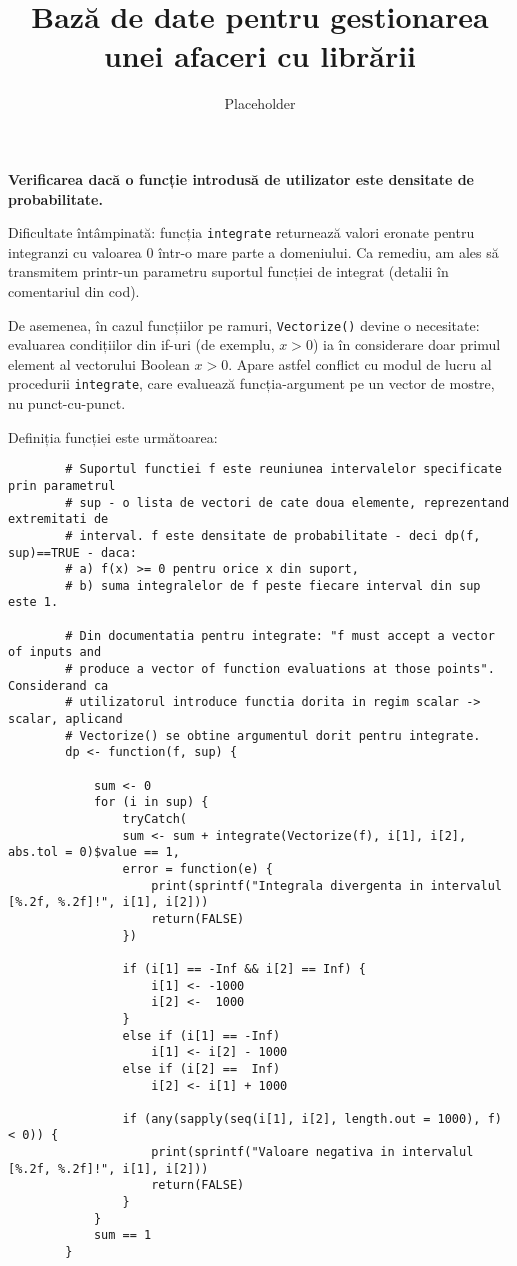 \documentclass[12pt]{article}
\title{Bază de date pentru gestionarea unei afaceri cu librării}
\author{Placeholder}
\begin{document}
	\textbf{Verificarea dacă o funcție introdusă de utilizator este densitate de probabilitate.}\vspace{5mm}
	
	Dificultate întâmpinată: funcția \lstinline|integrate| returnează valori eronate pentru integranzi cu valoarea $0$ într-o mare parte a domeniului. Ca remediu, am ales să transmitem printr-un parametru suportul funcției de integrat (detalii în comentariul din cod).\par
	De asemenea, în cazul funcțiilor pe ramuri, \lstinline|Vectorize()| devine o necesitate: evaluarea condițiilor din if-uri (de exemplu, $x > 0$) ia în considerare doar primul element al vectorului Boolean $x > 0$. Apare astfel conflict cu modul de lucru al procedurii \lstinline|integrate|, care evaluează funcția-argument pe un vector de mostre, nu punct-cu-punct.\par
	Definiția funcției este următoarea: \\
	
	\begin{lstlisting}
		# Suportul functiei f este reuniunea intervalelor specificate prin parametrul
		# sup - o lista de vectori de cate doua elemente, reprezentand extremitati de
		# interval. f este densitate de probabilitate - deci dp(f, sup)==TRUE - daca:
		# a) f(x) >= 0 pentru orice x din suport,
		# b) suma integralelor de f peste fiecare interval din sup este 1.
		
		# Din documentatia pentru integrate: "f must accept a vector of inputs and
		# produce a vector of function evaluations at those points". Considerand ca
		# utilizatorul introduce functia dorita in regim scalar -> scalar, aplicand
		# Vectorize() se obtine argumentul dorit pentru integrate.
		dp <- function(f, sup) {
			
			sum <- 0
			for (i in sup) {
				tryCatch(
				sum <- sum + integrate(Vectorize(f), i[1], i[2], abs.tol = 0)$value == 1,
				error = function(e) {
					print(sprintf("Integrala divergenta in intervalul [%.2f, %.2f]!", i[1], i[2]))
					return(FALSE)
				})
				
				if (i[1] == -Inf && i[2] == Inf) {
					i[1] <- -1000
					i[2] <-  1000
				}
				else if (i[1] == -Inf)
					i[1] <- i[2] - 1000
				else if (i[2] ==  Inf)
					i[2] <- i[1] + 1000
				
				if (any(sapply(seq(i[1], i[2], length.out = 1000), f) < 0)) {
					print(sprintf("Valoare negativa in intervalul [%.2f, %.2f]!", i[1], i[2]))
					return(FALSE)
				}
			}
			sum == 1
		}
	\end{lstlisting}\vspace*{3\baselineskip} 
\end{document}
